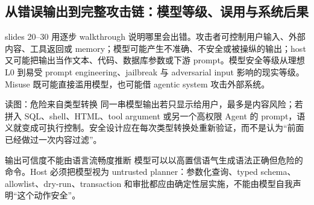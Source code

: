 \subsection{从错误输出到完整攻击链：模型等级、误用与系统后果}

slides 20--30 用逐步 walkthrough 说明哪里会出错。攻击者可控制用户输入、外部内容、工具返回或 memory；模型可能产生不准确、不安全或被操纵的输出；host 又可能把输出当作文本、代码、数据库参数或下游 prompt。模型安全等级从理想 L0 到易受 prompt engineering、jailbreak 与 adversarial input 影响的现实等级。Misuse 既可能直接滥用模型，也可能借 agentic system 攻击外部系统。


\begin{knowledgebox}{读图：危险来自类型转换}
同一串模型输出若只显示给用户，最多是内容风险；若拼入 SQL、shell、HTML、tool argument 或另一个高权限 Agent 的 prompt，语义就变成可执行控制。安全设计应在每次类型转换处重新验证，而不是认为“前面已经做过一次内容过滤”。
\end{knowledgebox}

\begin{warningbox}{输出可信度不能由语言流畅度推断}
模型可以以高置信语气生成语法正确但危险的命令。Host 必须把模型视为 untrusted planner：参数化查询、typed schema、allowlist、dry-run、transaction 和审批都应由确定性层实施，不能由模型自我声明“这个动作安全”。
\end{warningbox}

